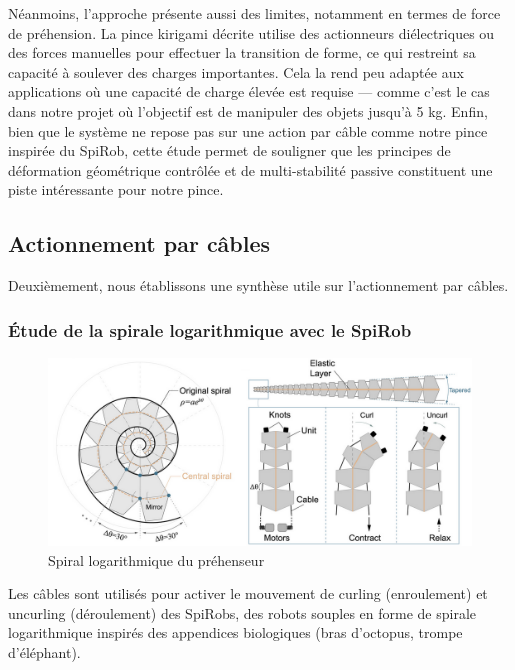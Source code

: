 \documentclass[a4paper, 11pt]{report}
\begin{document}
            Néanmoins, l’approche présente aussi des limites, notamment en termes de force de préhension. La pince kirigami décrite utilise des actionneurs diélectriques ou des forces manuelles pour effectuer la transition de forme, ce qui restreint sa capacité à soulever des charges importantes. Cela la rend peu adaptée aux applications où une capacité de charge élevée est requise — comme c’est le cas dans notre projet où l’objectif est de manipuler des objets jusqu’à 5 kg. Enfin, bien que le système ne repose pas sur une action par câble comme notre pince inspirée du SpiRob, cette étude permet de souligner que les principes de déformation géométrique contrôlée et de multi-stabilité passive constituent une piste intéressante pour notre pince.
    
    \subsection{Actionnement par câbles}

        Deuxièmement, nous établissons une synthèse utile sur l'actionnement par câbles.
    
        \subsubsection{Étude de la spirale logarithmique avec le SpiRob}
        
            \begin{figure}
                \centering
                \includegraphics[width=1.0\textwidth]{Figures/spiral_logarithm.png}
                \caption{Spiral logarithmique du préhenseur \cite{wang_spirobs_2025}}
                \label{fig:spiral_logarithm}
            \end{figure}
    
            Les câbles sont utilisés pour activer le mouvement de curling (enroulement) et uncurling (déroulement) des SpiRobs, des robots souples en forme de spirale logarithmique inspirés des appendices biologiques (bras d'octopus, trompe d'éléphant).
\end{document}

